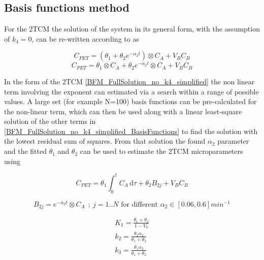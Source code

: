 \subsection{Basis functions method}
For the 2TCM the solution of the system in its general form, with the assumption of $k_4 = 0$, can be re-written according to \cite{Hong2010} as 

\begin{equation} \label{BFM_FullSolution_no_k4}
C_{PET} = (\theta_1 + \theta_2 e^{-\alpha_2 t } ) \otimes C_A + V_B C_B
\end{equation}
\begin{equation} \label{BFM_FullSolution_no_k4_simplified}
C_{PET} = \theta_1 \otimes C_A + \theta_2 e^{-\alpha_2 t } \otimes C_A   + V_B C_B
\end{equation}

In the form of the 2TCM \ref{BFM_FullSolution_no_k4_simplified} the non linear term involving the exponent can estimated via a search within a range of possible values. A large set (for example N=100) basis functions can be pre-calculated for the non-linear term, which can then be used along with a linear least-square solution of the other terms in \ref{BFM_FullSolution_no_k4_simplified_BasisFunctions} to find the solution with the lowest residual sum of squares. From that solution the found $\alpha_2$ parameter and the fitted $\theta_1$ and $\theta_2$ can be used to estimate the 2TCM microparameters using

\begin{equation} \label{BFM_FullSolution_no_k4_simplified_BasisFunctions}
C_{PET} = \theta_1 \int_0^t \! C_A \, \mathrm{d}\tau + \theta_2 B_{2j}   + V_B C_B
\end{equation}

\begin{equation} \label{BasisFunctions}
B_{2j} = e^{-\alpha_2 t } \otimes C_A   \ \ ; \  j=1..N \textrm{ for different } \alpha_2 \in [0.06,0.6]min^{-1}
\end{equation}


\begin{subequations}
\begin{align}
K_1 = \frac{\theta_1 + \theta_2}{1-V_b} \\
k_2 = \frac{\theta_2\alpha_2}{\theta_1 + \theta_2} \\
k_3 = \frac{\theta_1\alpha_2}{\theta_1 + \theta_2}
\end{align}
\label{eqn:FDG_microparameters}
\end{subequations}

